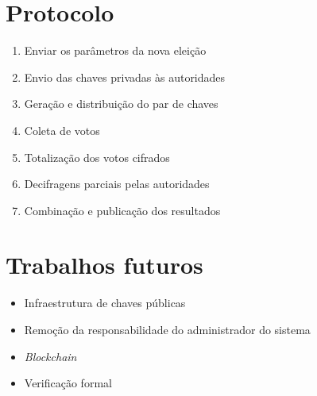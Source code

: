 \documentclass[14pt]{beamer}
\begin{document}
\section{Protocolo}

\begin{frame}{\secname}
    \begin{enumerate}
        \item Enviar os parâmetros da nova eleição
        \item Envio das chaves privadas às autoridades
        \item Geração e distribuição do par de chaves
        \item Coleta de votos
        \item Totalização dos votos cifrados
        \item Decifragens parciais pelas autoridades
        \item Combinação e publicação dos resultados
    \end{enumerate}

\end{frame}

\section{Trabalhos futuros}

\begin{frame}{\secname}
    \begin{itemize}
        \item<1-> Infraestrutura de chaves públicas

        \item<2-> Remoção da responsabilidade do administrador do sistema

        \item<3-> \textit{Blockchain}

        \item<4-> Verificação formal
    \end{itemize}
\end{frame}
\end{document}
